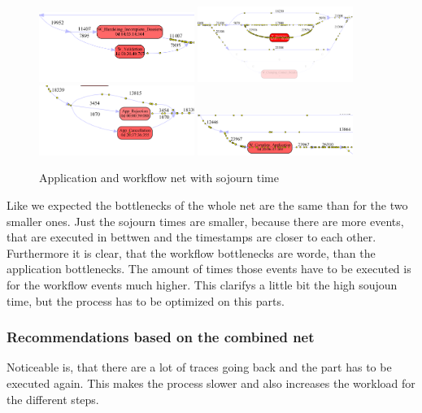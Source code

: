 \begin{figure}[!htbp]
\centering
\includegraphics[width = 0.45\textwidth]{APP_Work_BottleVal.PNG}
\includegraphics[width = 0.45\textwidth]{APP_Work_BottleQuot.PNG}
\includegraphics[width = 0.45\textwidth]{APP_Work_BottleCanc.PNG}
\includegraphics[width = 0.45\textwidth]{APP_Work_BottleCompl.PNG}
\caption{Application and workflow net with sojourn time}
\label{fig: AppWorkSojuComp}
\end{figure}

Like we expected the bottlenecks of the whole net are the same than for the two smaller ones. Just the sojourn times are smaller, because there are more events, that are executed in bettwen and the timestamps are closer to each other. Furthermore it is clear, that the workflow bottlenecks are worde, than the application bottlenecks. The amount of times those events have to be executed is for the workflow events much higher. This clarifys a little bit the high soujoun time, but the process has to be optimized on this parts.

\subsubsection{Recommendations based on the combined net}

Noticeable is, that there are a lot of traces going back and the part has to be executed again. This makes the process slower and also increases the workload for the different steps. 
